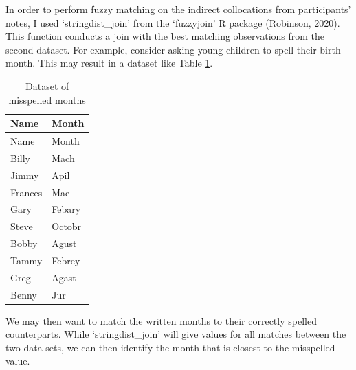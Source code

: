 \documentclass[print]{nuthesis}
\begin{document}
In order to perform fuzzy matching on the indirect collocations from participants' notes, I used `stringdist\_join' from the `fuzzyjoin' R package (Robinson, 2020).
This function conducts a join with the best matching observations from the second dataset.
For example, consider asking young children to spell their birth month.
This may result in a dataset like Table \ref{tab:months}.

\begin{longtable}[]{@{}ll@{}}
\caption{Dataset of misspelled months \label{tab:months}}\tabularnewline
\toprule\noalign{}
Name & Month \\
\midrule\noalign{}
\endfirsthead
\toprule\noalign{}
Name & Month \\
\midrule\noalign{}
\endhead
\bottomrule\noalign{}
\endlastfoot
Billy & Mach \\
Jimmy & Apil \\
Frances & Mae \\
Gary & Febary \\
Steve & Octobr \\
Bobby & Agust \\
Tammy & Febrey \\
Greg & Agast \\
Benny & Jur \\
\end{longtable}

We may then want to match the written months to their correctly spelled counterparts.
While `stringdist\_join' will give values for all matches between the two data sets, we can then identify the month that is closest to the misspelled value.
\end{document}
